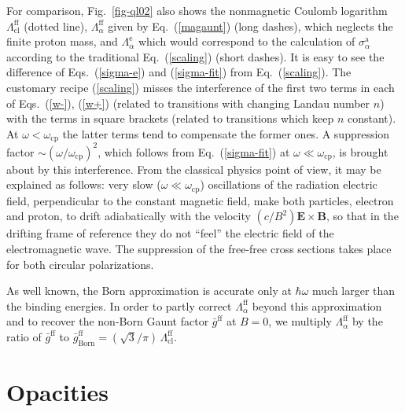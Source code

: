 \documentclass{emulateapj}
\newcommand{\req}[1]{Eq.\ (\ref{#1})}
\newcommand{\omp}{\omega_\mathrm{cp}}
\begin{document}
For comparison, Fig.\ \ref{fig-ql02} also shows the  
nonmagnetic Coulomb logarithm $\Lambda_\mathrm{cl}^\mathrm{ff}$ 
(dotted line), $\Lambda_\alpha^\mathrm{ff}$ 
given by \req{magaunt} (long dashes), 
which neglects the finite proton mass,
and $\Lambda_\alpha^\mathrm{e}$ which would correspond to the
calculation of $\sigma_\alpha^\mathrm{a}$ according to 
the traditional \req{scaling} (short dashes).
It is easy to see the difference of Eqs.\ (\ref{sigma-e})
and (\ref{sigma-fit}) from \req{scaling}.
The customary recipe (\ref{scaling}) misses the interference
of the first two terms 
in each of Eqs.\ (\ref{w-}), (\ref{w+})
(related to transitions with changing Landau number $n$)
with the terms in square brackets
(related to transitions which keep $n$ constant).
At $\omega < \omp$ the latter terms tend to compensate
the former ones. 
A suppression factor $\sim(\omega/\omp)^2$, which follows
from \req{sigma-fit} at $\omega\ll\omp$,
is brought about by this interference.
From the classical physics point of view, it may be explained
as follows: very slow ($\omega\ll\omp$)
oscillations of the radiation electric field, perpendicular to the
constant magnetic field, make both particles, electron
and proton, to drift adiabatically
with the velocity $(c/B^2)\bm{E}\times\bm{B}$, 
so that in the drifting frame of reference
 they do not ``feel'' the electric field
 of the electromagnetic wave.
The suppression of the free-free
cross sections takes place for both circular polarizations.

As well known, the Born approximation is accurate
only at $\hbar\omega$ much larger than the binding energies.
In order to partly correct $\Lambda_\alpha^\mathrm{ff}$
beyond this approximation and to
recover the non-Born Gaunt factor $\bar{g}^\mathrm{ff}$ at $B=0$,
we multiply 
$\Lambda_\alpha^\mathrm{ff}$ by the ratio of 
$\bar{g}^\mathrm{ff}$ \citep{Hummer88}
to $\bar{g}_\mathrm{Born}^\mathrm{ff}
=(\sqrt{3}/\pi)\,\Lambda_\mathrm{cl}^\mathrm{ff}$.

\section{Opacities}
\label{sect-opac}
%
\end{document}
